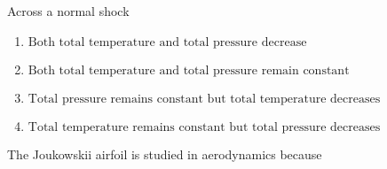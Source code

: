 \iffalse
\chapter{2007}
\section{ae}
\author{EE24BTECH11030}
\fi
\item Across a normal shock
    \begin{enumerate}
        \item $ \text{Both total temperature and total pressure decrease} $
        \item $ \text{Both total temperature and total pressure remain constant} $
        \item $ \text{Total pressure remains constant but total temperature decreases} $
        \item $ \text{Total temperature remains constant but total pressure decreases} $
    \end{enumerate}
\bigskip
\item The Joukowskii airfoil is studied in aerodynamics because


